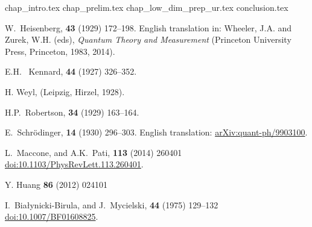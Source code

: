 \documentclass[a4paper,11pt,leqno,openbib]{memoir} %
\newcommand{\clearemptydoublepage}{\newpage{\thispagestyle{empty}\cleardoublepage}}
\theoremstyle{plain}
\theoremstyle{plain}
\theoremstyle{plain}
\theoremstyle{definition}
\theoremstyle{plain}
\theoremstyle{plain}
\theoremstyle{plain}
\numberwithin{equation}{section}
\begin{document}
%
% 
\mainmatter
\restorepagenumber
%
{chap_intro.tex}
\clearemptydoublepage
{chap_prelim.tex}
\clearemptydoublepage
{chap_low_dim_prep_ur.tex}
\clearemptydoublepage
{conclusion.tex}
\clearemptydoublepage
%
%

\bibname
\begin{thebibliography}{100}
  W.~Heisenberg,
   {\bf 43} (1929) 172--198. English translation in: Wheeler, J.A. and Zurek, W.H. (eds), {\em Quantum Theory and Measurement} (Princeton University Press, Princeton, 1983, 2014).%

  E.H. ~Kennard,
   {\bf 44} (1927) 326--352.%

  H. Weyl,
   (Leipzig, Hirzel, 1928).

  H.P.~Robertson,
   {\bf 34} (1929) 163--164.%

  E.~Schr\"odinger,
   {\bf 14} (1930) 296--303.
  English translation: \href{https://arxiv.org/abs/quant-ph/9903100}{arXiv:quant-ph/9903100}.%

  L.~Maccone, and A.K.~Pati,
   {\bf 113} (2014) 260401
  \href{https://doi.org/10.1103/PhysRevLett.113.260401}{doi:10.1103/PhysRevLett.113.260401}.

 Y. Huang
    {\bf 86} (2012) 024101

 I.\  Bia\l{}ynicki-Birula, and J.~Mycielski,
   {\bf 44} (1975) 129--132
  \href{https://doi.org/10.1007/BF01608825}{doi:10.1007/BF01608825}.


\end{thebibliography}
\end{document}
